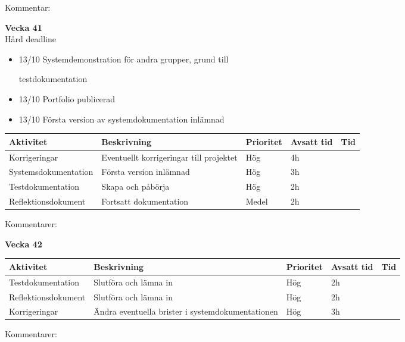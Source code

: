 \documentclass{mall}
\begin{document}
Kommentar:

\pagebreak

\hphantom{$\bullet$} \textbf{Vecka 41}\\

Hård deadline

\begin{itemize}
\color{red}
    \item 13/10 Systemdemonstration för andra grupper, grund till

testdokumentation

    \item 13/10 Portfolio publicerad

    \item 13/10 Första version av systemdokumentation inlämnad

\end{itemize}

\begin{table}[!h]
\begin{tabularx}{\textwidth}{|l|X|l|l|l|}
  \hline
Aktivitet            & Beskrivning                             & Prioritet  & Avsatt tid & Tid \\  \hline
Korrigeringar        & Eventuellt korrigeringar till projektet & Hög   & 4h         &     \\  \hline
Systemsdokumentation & Första version inlämnad                 & Hög   & 3h         &     \\  \hline
Testdokumentation    & Skapa och påbörja                       & Hög   & 2h         &     \\  \hline
Reflektionsdokument  & Fortsatt dokumentation                  & Medel & 2h         &    \\   \hline
\end{tabularx}
\end{table}
Kommentarer:

\pagebreak

\hphantom{$\bullet$} \textbf{Vecka 42}\\

\begin{table}[h]
\begin{tabularx}{\textwidth}{|l|X|l|l|l|}
  \hline
Aktivitet           & Beskrivning                                      & Prioritet & Avsatt tid & Tid \\  \hline
Testdokumentation   & Slutföra och lämna in                            & Hög  & 2h         &     \\  \hline
Reflektionsdokument & Slutföra och lämna in                            & Hög  & 2h         &     \\  \hline
Korrigeringar       & Ändra eventuella brister i
systemdokumentationen & Hög  & 3h         &
\\   \hline
\end{tabularx}
\end{table}

Kommentarer:
\end{document}
